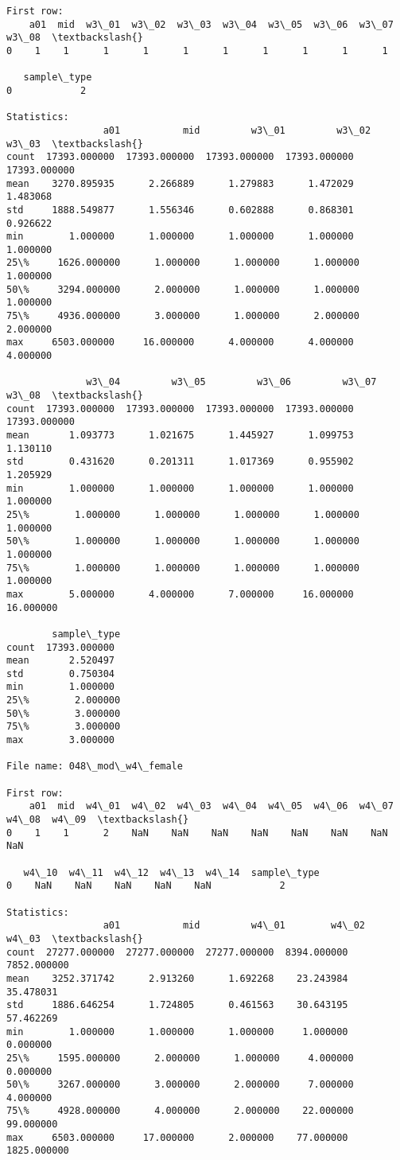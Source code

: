 \documentclass[11pt]{article}
\begin{document}
\begin{Verbatim}[commandchars=\\\{\}]
First row: 
    a01  mid  w3\_01  w3\_02  w3\_03  w3\_04  w3\_05  w3\_06  w3\_07  w3\_08  \textbackslash{}
0    1    1      1      1      1      1      1      1      1      1   

   sample\_type  
0            2  

Statistics: 
                 a01           mid         w3\_01         w3\_02         w3\_03  \textbackslash{}
count  17393.000000  17393.000000  17393.000000  17393.000000  17393.000000   
mean    3270.895935      2.266889      1.279883      1.472029      1.483068   
std     1888.549877      1.556346      0.602888      0.868301      0.926622   
min        1.000000      1.000000      1.000000      1.000000      1.000000   
25\%     1626.000000      1.000000      1.000000      1.000000      1.000000   
50\%     3294.000000      2.000000      1.000000      1.000000      1.000000   
75\%     4936.000000      3.000000      1.000000      2.000000      2.000000   
max     6503.000000     16.000000      4.000000      4.000000      4.000000   

              w3\_04         w3\_05         w3\_06         w3\_07         w3\_08  \textbackslash{}
count  17393.000000  17393.000000  17393.000000  17393.000000  17393.000000   
mean       1.093773      1.021675      1.445927      1.099753      1.130110   
std        0.431620      0.201311      1.017369      0.955902      1.205929   
min        1.000000      1.000000      1.000000      1.000000      1.000000   
25\%        1.000000      1.000000      1.000000      1.000000      1.000000   
50\%        1.000000      1.000000      1.000000      1.000000      1.000000   
75\%        1.000000      1.000000      1.000000      1.000000      1.000000   
max        5.000000      4.000000      7.000000     16.000000     16.000000   

        sample\_type  
count  17393.000000  
mean       2.520497  
std        0.750304  
min        1.000000  
25\%        2.000000  
50\%        3.000000  
75\%        3.000000  
max        3.000000  

File name: 048\_mod\_w4\_female

First row: 
    a01  mid  w4\_01  w4\_02  w4\_03  w4\_04  w4\_05  w4\_06  w4\_07  w4\_08  w4\_09  \textbackslash{}
0    1    1      2    NaN    NaN    NaN    NaN    NaN    NaN    NaN    NaN   

   w4\_10  w4\_11  w4\_12  w4\_13  w4\_14  sample\_type  
0    NaN    NaN    NaN    NaN    NaN            2  

Statistics: 
                 a01           mid         w4\_01        w4\_02        w4\_03  \textbackslash{}
count  27277.000000  27277.000000  27277.000000  8394.000000  7852.000000   
mean    3252.371742      2.913260      1.692268    23.243984    35.478031   
std     1886.646254      1.724805      0.461563    30.643195    57.462269   
min        1.000000      1.000000      1.000000     1.000000     0.000000   
25\%     1595.000000      2.000000      1.000000     4.000000     0.000000   
50\%     3267.000000      3.000000      2.000000     7.000000     4.000000   
75\%     4928.000000      4.000000      2.000000    22.000000    99.000000   
max     6503.000000     17.000000      2.000000    77.000000  1825.000000   


\end{Verbatim}
\end{document}
